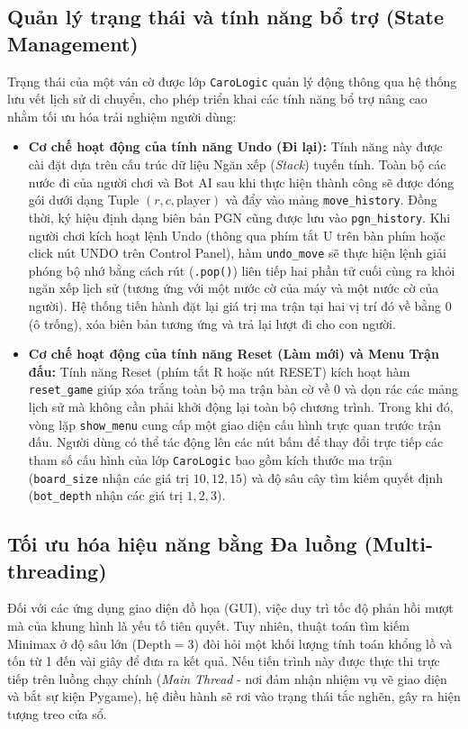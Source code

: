\subsection{Quản lý trạng thái và tính năng bổ trợ (State Management)}
Trạng thái của một ván cờ được lớp \texttt{CaroLogic} quản lý động thông qua hệ thống lưu vết lịch sử di chuyển, cho phép triển khai các tính năng bổ trợ nâng cao nhằm tối ưu hóa trải nghiệm người dùng:
\begin{itemize}
	\item \textbf{Cơ chế hoạt động của tính năng Undo (Đi lại):} Tính năng này được cài đặt dựa trên cấu trúc dữ liệu Ngăn xếp (\textit{Stack}) tuyến tính. Toàn bộ các nước đi của người chơi và Bot AI sau khi thực hiện thành công sẽ được đóng gói dưới dạng Tuple $(r, c, \text{player})$ và đẩy vào mảng \texttt{move\_history}. Đồng thời, ký hiệu định dạng biên bản PGN cũng được lưu vào \texttt{pgn\_history}. Khi người chơi kích hoạt lệnh Undo (thông qua phím tắt U trên bàn phím hoặc click nút UNDO trên Control Panel), hàm \texttt{undo\_move} sẽ thực hiện lệnh giải phóng bộ nhớ bằng cách rút (\texttt{.pop()}) liên tiếp hai phần tử cuối cùng ra khỏi ngăn xếp lịch sử (tương ứng với một nước cờ của máy và một nước cờ của người). Hệ thống tiến hành đặt lại giá trị ma trận tại hai vị trí đó về bằng $0$ (ô trống), xóa biên bản tương ứng và trả lại lượt đi cho con người.
	\item \textbf{Cơ chế hoạt động của tính năng Reset (Làm mới) và Menu Trận đấu:} Tính năng Reset (phím tắt R hoặc nút RESET) kích hoạt hàm \texttt{reset\_game} giúp xóa trắng toàn bộ ma trận bàn cờ về $0$ và dọn rác các mảng lịch sử mà không cần phải khởi động lại toàn bộ chương trình. Trong khi đó, vòng lặp \texttt{show\_menu} cung cấp một giao diện cấu hình trực quan trước trận đấu. Người dùng có thể tác động lên các nút bấm để thay đổi trực tiếp các tham số cấu hình của lớp \texttt{CaroLogic} bao gồm kích thước ma trận (\texttt{board\_size} nhận các giá trị $10, 12, 15$) và độ sâu cây tìm kiếm quyết định (\texttt{bot\_depth} nhận các giá trị $1, 2, 3$).
\end{itemize}

\subsection{Tối ưu hóa hiệu năng bằng Đa luồng (Multi-threading)}
Đối với các ứng dụng giao diện đồ họa (GUI), việc duy trì tốc độ phản hồi mượt mà của khung hình là yếu tố tiên quyết. Tuy nhiên, thuật toán tìm kiếm Minimax ở độ sâu lớn ($\text{Depth} = 3$) đòi hỏi một khối lượng tính toán khổng lồ và tốn từ 1 đến vài giây để đưa ra kết quả. Nếu tiến trình này được thực thi trực tiếp trên luồng chạy chính (\textit{Main Thread} - nơi đảm nhận nhiệm vụ vẽ giao diện và bắt sự kiện Pygame), hệ điều hành sẽ rơi vào trạng thái tắc nghẽn, gây ra hiện tượng treo cửa sổ.

